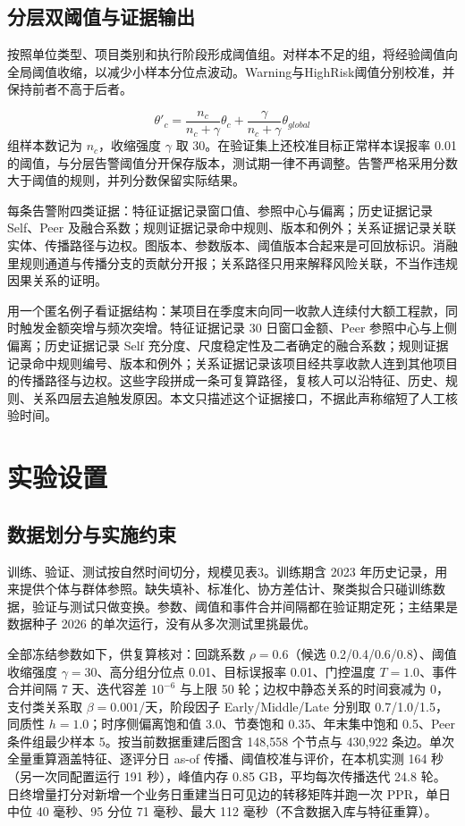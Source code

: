 \documentclass[a4paper,fleqn]{cas-dc}
\begin{document}
\subsection{分层双阈值与证据输出}
按照单位类型、项目类别和执行阶段形成阈值组。对样本不足的组，将经验阈值向全局阈值收缩，以减少小样本分位点波动。Warning与HighRisk阈值分别校准，并保持前者不高于后者。

\begin{equation}
\theta'_{c} = \frac{n_c}{n_c + \gamma}\theta_c + \frac{\gamma}{n_c + \gamma}\theta_{global}
\end{equation}
组样本数记为 $n_c$，收缩强度 $\gamma$ 取 30。在验证集上还校准目标正常样本误报率 0.01 的阈值，与分层告警阈值分开保存版本，测试期一律不再调整。告警严格采用分数大于阈值的规则，并列分数保留实际结果。

每条告警附四类证据：特征证据记录窗口值、参照中心与偏离；历史证据记录 Self、Peer 及融合系数；规则证据记录命中规则、版本和例外；关系证据记录关联实体、传播路径与边权。图版本、参数版本、阈值版本合起来是可回放标识。消融里规则通道与传播分支的贡献分开报；关系路径只用来解释风险关联，不当作违规因果关系的证明。

用一个匿名例子看证据结构：某项目在季度末向同一收款人连续付大额工程款，同时触发金额突增与频次突增。特征证据记录 30 日窗口金额、Peer 参照中心与上侧偏离；历史证据记录 Self 充分度、尺度稳定性及二者确定的融合系数；规则证据记录命中规则编号、版本和例外；关系证据记录该项目经共享收款人连到其他项目的传播路径与边权。这些字段拼成一条可复算路径，复核人可以沿特征、历史、规则、关系四层去追触发原因。本文只描述这个证据接口，不据此声称缩短了人工核验时间。

\section{实验设置}
\subsection{数据划分与实施约束}
训练、验证、测试按自然时间切分，规模见表3。训练期含 2023 年历史记录，用来提供个体与群体参照。缺失填补、标准化、协方差估计、聚类拟合只碰训练数据，验证与测试只做变换。参数、阈值和事件合并间隔都在验证期定死；主结果是数据种子 2026 的单次运行，没有从多次测试里挑最优。

全部冻结参数如下，供复算核对：回跳系数 $\rho=0.6$（候选 0.2/0.4/0.6/0.8）、阈值收缩强度 $\gamma=30$、高分组分位点 0.01、目标误报率 0.01、门控温度 $T=1.0$、事件合并间隔 7 天、迭代容差 $10^{-6}$ 与上限 50 轮；边权中静态关系的时间衰减为 0，支付类关系取 $\beta=0.001$/天，阶段因子 Early/Middle/Late 分别取 0.7/1.0/1.5，同质性 $h=1.0$；时序侧偏离饱和值 3.0、节奏饱和 0.35、年末集中饱和 0.5、Peer 条件组最少样本 5。按当前数据重建后图含 148,558 个节点与 430,922 条边。单次全量重算涵盖特征、逐评分日 as-of 传播、阈值校准与评价，在本机实测 164 秒（另一次同配置运行 191 秒），峰值内存 0.85 GB，平均每次传播迭代 24.8 轮。日终增量打分对新增一个业务日重建当日可见边的转移矩阵并跑一次 PPR，单日中位 40 毫秒、95 分位 71 毫秒、最大 112 毫秒（不含数据入库与特征重算）。
\end{document}

